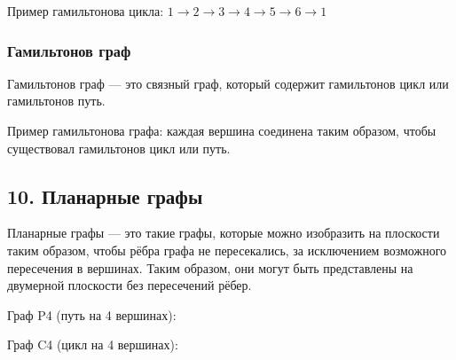 \documentclass{article}
\begin{document}
Пример гамильтонова цикла: \(1 \to 2 \to 3 \to 4 \to 5 \to 6 \to 1 \)

\subsubsection*{Гамильтонов граф}

Гамильтонов граф — это связный граф, который содержит гамильтонов цикл или гамильтонов путь.

\begin{center}
\end{center}

Пример гамильтонова графа: каждая вершина соединена таким образом, чтобы существовал гамильтонов цикл или путь.
\pagebreak

\subsection*{10.  Планарные графы }

Планарные графы — это такие графы, которые можно изобразить на плоскости таким образом, чтобы рёбра графа не пересекались, за исключением возможного пересечения в вершинах. Таким образом, они могут быть представлены на двумерной плоскости без пересечений рёбер.

Граф P4 (путь на 4 вершинах):
\begin{center}
\end{center}

Граф C4 (цикл на 4 вершинах):
\begin{center}
\end{center}
\end{document}
